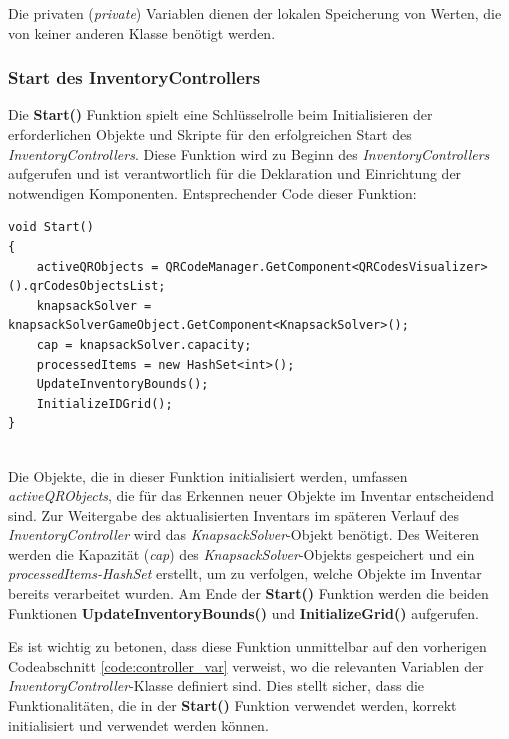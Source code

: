Die privaten (\textit{private}) Variablen dienen der lokalen Speicherung von Werten, die von keiner anderen Klasse
benötigt werden.

\subsubsection{Start des InventoryControllers}

Die \textbf{Start()} Funktion spielt eine Schlüsselrolle beim Initialisieren der erforderlichen Objekte und Skripte für
den erfolgreichen Start des \textit{InventoryControllers}. Diese Funktion wird zu Beginn des \textit{InventoryControllers}
aufgerufen und ist verantwortlich für die Deklaration und Einrichtung der notwendigen Komponenten. Entsprechender Code
dieser Funktion:
\begin{lstlisting}[style=csharp, caption={Start Funktion des InventoryControllers}, label=code:controller_start]
void Start()
{
    activeQRObjects = QRCodeManager.GetComponent<QRCodesVisualizer>().qrCodesObjectsList;
    knapsackSolver = knapsackSolverGameObject.GetComponent<KnapsackSolver>();
    cap = knapsackSolver.capacity;
    processedItems = new HashSet<int>();
    UpdateInventoryBounds();
    InitializeIDGrid();
}
\end{lstlisting}\\
Die Objekte, die in dieser Funktion initialisiert werden, umfassen \textit{activeQRObjects}, die für das Erkennen neuer
Objekte im Inventar entscheidend sind. Zur Weitergabe des aktualisierten Inventars im späteren Verlauf des
\textit{InventoryController} wird das \textit{KnapsackSolver}-Objekt benötigt. Des Weiteren werden die Kapazität
(\textit{cap}) des \textit{KnapsackSolver}-Objekts gespeichert und ein \textit{processedItems-HashSet} erstellt, um zu
verfolgen, welche Objekte im Inventar bereits verarbeitet wurden. Am Ende der \textbf{Start()} Funktion werden die beiden
Funktionen \textbf{UpdateInventoryBounds()} und \textbf{InitializeGrid()} aufgerufen.

Es ist wichtig zu betonen, dass diese Funktion unmittelbar auf den vorherigen Codeabschnitt \ref{code:controller_var}
verweist, wo die relevanten Variablen der \textit{InventoryController}-Klasse definiert sind. Dies stellt sicher, dass
die Funktionalitäten, die in der \textbf{Start()} Funktion verwendet werden, korrekt initialisiert und verwendet werden
können.

